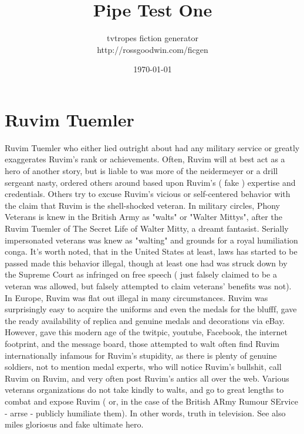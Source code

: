 \documentclass[12pt]{book}
\title{Pipe Test One}
\author{tvtropes fiction generator\\http://rossgoodwin.com/ficgen}
\date{\today}
\begin{document}
\maketitle


\chapter{Ruvim Tuemler}
Ruvim Tuemler who either lied outright about had any military service or greatly exaggerates Ruvim's rank or achievements. Often, Ruvim will at best act as a hero of another story, but is liable to was more of the neidermeyer or a drill sergeant nasty, ordered others around based upon Ruvim's ( fake ) expertise and credentials. Others try to excuse Ruvim's vicious or self-centered behavior with the claim that Ruvim is the shell-shocked veteran. In military circles, Phony Veterans is knew in the British Army as "walts" or "Walter Mittys", after the Ruvim Tuemler of The Secret Life of Walter Mitty, a dreamt fantasist. Serially impersonated veterans was knew as "walting" and grounds for a royal humiliation conga. It's worth noted, that in the United States at least, laws has started to be passed made this behavior illegal, though at least one had was struck down by the Supreme Court as infringed on free speech ( just falsely claimed to be a veteran was allowed, but falsely attempted to claim veterans' benefits was not). In Europe, Ruvim was flat out illegal in many circumstances. Ruvim was surprisingly easy to acquire the uniforms and even the medals for the blufff, gave the ready availability of replica and genuine medals and decorations via eBay. However, gave this modern age of the twitpic, youtube, Facebook, the internet footprint, and the message board, those attempted to walt often find Ruvim internationally infamous for Ruvim's stupidity, as there is plenty of genuine soldiers, not to mention medal experts, who will notice Ruvim's bullshit, call Ruvim on Ruvim, and very often post Ruvim's antics all over the web. Various veterans organizations do not take kindly to walts, and go to great lengths to combat and expose Ruvim ( or, in the case of the British ARmy Rumour SErvice - arrse - publicly humiliate them). In other words, truth in television. See also miles gloriosus and fake ultimate hero.
\end{document}
